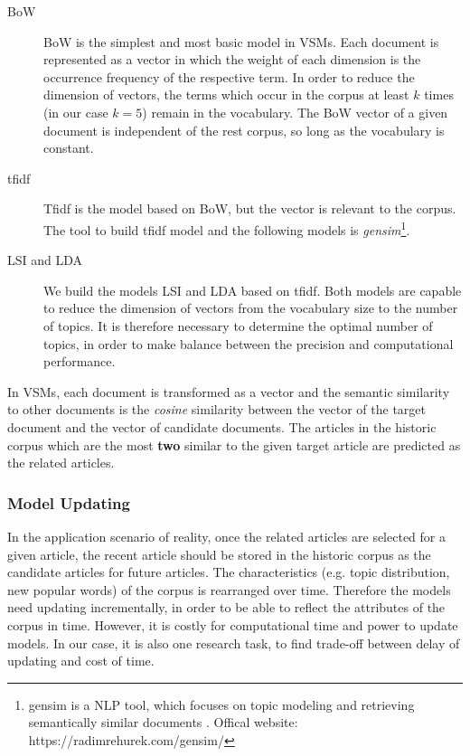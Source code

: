 \begin{description}
\item[BoW] BoW is the simplest and most basic model in VSMs. Each document is represented as a vector in which the weight of each dimension is the occurrence frequency of the respective term. In order to reduce the dimension of vectors, the terms which occur in the corpus at least $k$ times (in our case $k=5$) remain in the vocabulary. The BoW vector of a given document is independent of the rest corpus, so long as the vocabulary is constant. 
\item[tfidf] Tfidf is the model based on BoW, but the vector is relevant to the corpus. The tool to build tfidf model and the following models is \textit{gensim}\footnote{gensim is a NLP tool, which focuses on topic modeling and retrieving semantically similar documents \cite{rehurek_lrec}. Offical website:  https://radimrehurek.com/gensim/}.
\item[LSI and LDA] We build the models LSI and LDA based on tfidf. Both models are capable to reduce the dimension of vectors from the vocabulary size to the number of topics. It is therefore necessary to determine the optimal number of topics, in order to make balance between the precision and computational performance. 
\end{description}

In VSMs, each document is transformed as a vector and the semantic similarity to other documents is the \textit{cosine} similarity between the vector of the target document and the vector of candidate documents. The articles in the historic corpus which are the most \textbf{two} similar to the given target article are predicted as the related articles. 

\subsubsection{Model Updating}

In the application scenario of reality, once the related articles are selected for a given article, the recent article should be stored in the historic corpus as the candidate articles for future articles. The characteristics (e.g. topic distribution, new popular words) of the corpus is rearranged over time. Therefore the models need updating incrementally, in order to be able to reflect the attributes of the corpus in time. However, it is costly for computational time and power to update models. In our case, it is also one research task, to find trade-off between delay of updating and cost of time.

